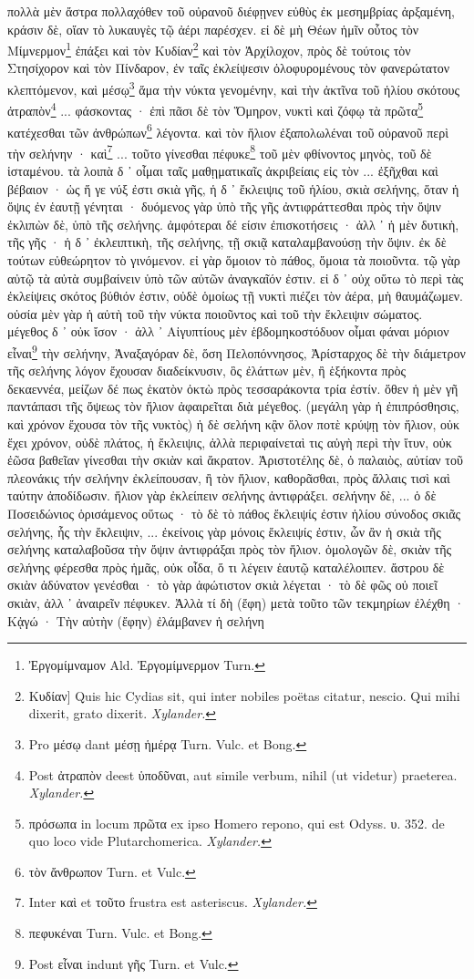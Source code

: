 \documentclass[a4paper, 11pt, oneside, polutonikogreek, german]{article}
\begin{document}
πολλὰ μὲν ἄστρα πολλαχόθεν τοῦ οὐρανοῦ διέφῃνεν εὐθὺς ἐκ μεσημβρίας ἀρξαμένη, κράσιν δὲ, οἵαν τὸ λυκαυγὲς τῷ ἀέρι παρέσχεν. εἰ δὲ μὴ Θέων ἡμῖν οὗτος τὸν Μίμνερμον\footnote{Ἐργομίμναμον Ald. Ἐργομίμνερμον Turn.} ἐπάξει καὶ τὸν Κυδίαν\footnote{Κυδίαν] Quis hic Cydias sit, qui inter nobiles poëtas citatur, nescio. Qui mihi dixerit, grato dixerit. \emph{Xylander.}} καὶ τὸν Ἀρχίλοχον, πρὸς δὲ τούτοις τὸν Στησίχορον καὶ τὸν Πίνδαρον, ἐν ταῖς ἐκλείψεσιν ὀλοφυρομένους τὸν φανερώτατον κλεπτόμενον, καὶ μέσῳ\footnote{Pro μέσῳ dant μέσῃ ἡμέρᾳ Turn. Vulc. et Bong.} ἅμα τὴν νύκτα γενομένην, καὶ τὴν ἀκτῖνα τοῦ ἡλίου σκότους ἀτραπὸν\footnote{Post ἀτραπὸν deest ὑποδῦναι, aut simile verbum, nihil (ut videtur) praeterea. \emph{Xylander.}} ... φάσκοντας · ἐπὶ πᾶσι δὲ τὸν Ὅμηρον, νυκτὶ καὶ ζόφῳ τὰ πρῶτα\footnote{πρόσωπα in locum πρῶτα ex ipso Homero repono, qui est Odyss. υ. 352. de quo loco vide Plutarchomerica. \emph{Xylander.}} κατέχεσθαι τῶν ἀνθρώπων\footnote{τὸν ἄνθρωπον Turn. et Vulc.} λέγοντα. καὶ τὸν ἥλιον ἐξαπολωλέναι τοῦ οὐρανοῦ περὶ τὴν σελήνην · καὶ\footnote{Inter καὶ et τοῦτο frustra est asteriscus. \emph{Xylander.}} ... τοῦτο γίνεσθαι πέφυκε\footnote{πεφυκέναι Turn. Vulc. et Bong.} τοῦ μὲν φθίνοντος μηνὸς, τοῦ δὲ ἱσταμένου. τὰ λοιπὰ δ ᾽ οἶμαι ταῖς μαθῃματικαῖς ἀκριβείαις εἰς τὸν ... ἐξῆχθαι καὶ βέβαιον · ὡς ἥ γε νύξ ἐστι σκιὰ γῆς, ἡ δ ᾽ ἔκλειψις τοῦ ἡλίου, σκιὰ σελήνης, ὅταν ἡ ὄψις ἐν ἑαυτῇ γένηται · δυόμενος γὰρ ὑπὸ τῆς γῆς ἀντιφράττεσθαι πρὸς τὴν ὄψιν ἐκλιπὼν δὲ, ὑπὸ τῆς σελήνης. ἀμφότεραι δέ είσιν ἐπισκοτήσεις · ἀλλ ᾽ ἡ μὲν δυτικὴ, τῆς γῆς · ἡ δ ᾽ ἐκλειπτικὴ, τῆς σελήνης, τῇ σκιᾷ καταλαμβανούσῃ τὴν ὄψιν. ἐκ δὲ τούτων εὐθεώρητον τὸ γινόμενον. εἰ γὰρ ὅμοιον τὸ πάθος, ὅμοια τὰ ποιοῦντα. τῷ γὰρ αὐτῷ τὰ αὐτὰ συμβαίνειν ὑπὸ τῶν αὐτῶν ἀναγκαῖόν ἐστιν. εἰ δ ᾽ οὐχ οὕτω τὸ περὶ τὰς ἐκλείψεις σκότος βύθιόν ἐστιν, οὐδὲ ὁμοίως τῇ νυκτὶ πιέζει τὸν ἀέρα, μὴ θαυμάζωμεν. οὐσία μὲν γὰρ ἡ αὐτὴ τοῦ τὴν νύκτα ποιοῦντος καὶ τοῦ τὴν ἔκλειψιν σώματος. μέγεθος δ ᾽ οὐκ ἴσον · ἀλλ ᾽ Αἰγυπτίους μὲν ἑβδομηκοστόδυον οἶμαι φάναι μόριον εἶναι\footnote{Post εἶναι indunt γῆς Turn. et Vulc.} τὴν σελήνην, Ἀναξαγόραν δὲ, ὅση Πελοπόννησος, Ἀρίσταρχος δὲ τὴν διάμετρον τῆς σελήνης λόγον ἔχουσαν διαδείκνυσιν, ὃς ἐλάττων μὲν, ἢ ἑξήκοντα πρὸς δεκαεννέα, μείζων δέ πως ἑκατὸν ὀκτὼ πρὸς τεσσαράκοντα τρία ἐστίν. ὅθεν ἡ μὲν γῆ παντάπασι τῆς ὄψεως τὸν ἥλιον ἀφαιρεῖται διὰ μέγεθος. (μεγάλη γὰρ ἡ ἐπιπρόσθησις, καὶ χρόνον ἔχουσα τὸν τῆς νυκτὸς) ἡ δὲ σελήνη κᾂν ὅλον ποτὲ κρύψῃ τὸν ἥλιον, οὐκ ἔχει χρόνον, οὐδὲ πλάτος, ἡ ἔκλειψις, ἀλλὰ περιφαίνεταὶ τις αὐγὴ περὶ τὴν ἴτυν, οὐκ ἐῶσα βαθεῖαν γίνεσθαι τὴν σκιὰν καὶ ἄκρατον. Ἀριστοτέλης δὲ, ὁ παλαιὸς, αὐτίαν τοῦ πλεονάκις τήν σελήνην ἐκλείπουσαν, ἢ τὸν ἥλιον, καθορᾶσθαι, πρὸς ἄλλαις τισὶ καὶ ταύτην ἀποδίδωσιν. ἥλιον γὰρ ἐκλείπειν σελήνης ἀντιφράξει. σελήνην δὲ, ... ὁ δὲ Ποσειδώνιος ὁρισάμενος οὕτως · τὸ δὲ τὸ πάθος ἔκλειψίς ἐστιν ἡλίου σύνοδος σκιᾶς σελήνης, ἧς τὴν ἔκλειψιν, ... ἐκείνοις γὰρ μόνοις ἔκλειψίς ἐστιν, ὧν ἂν ἡ σκιὰ τῆς σελήνης καταλαβοῦσα τὴν ὄψιν ἀντιφράξαι πρὸς τὸν ἥλιον. ὁμολογῶν δὲ, σκιὰν τῆς σελήνης φέρεσθα πρὸς ἡμᾶς, οὐκ οἶδα, ὅ τι λέγειν ἑαυτῷ καταλέλοιπεν. ἄστρου δὲ σκιὰν ἀδύνατον γενέσθαι · τὸ γὰρ ἀφώτιστον σκιὰ λέγεται · τὸ δὲ φῶς οὐ ποιεῖ σκιὰν, ἀλλ ᾽ ἀναιρεῖν πέφυκεν. Ἀλλὰ τί δὴ (ἔφη) μετὰ τοῦτο τῶν τεκμηρίων ἐλέχθη · Κᾀγώ · Τὴν αὐτὴν (ἔφην) ἐλάμβανεν ἡ σελήνη 
\end{document}

